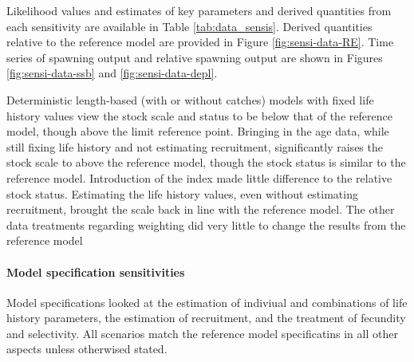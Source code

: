 \documentclass[11pt,
  english,
  a4paper,
]{article}
\begin{document}
\tagstructend


Likelihood values and estimates of key parameters and derived quantities from each sensitivity are available in Table \ref{tab:data_sensis}. Derived quantities relative to the reference model are provided in Figure \ref{fig:sensi-data-RE}. Time series of spawning output and relative spawning output are shown in Figures \ref{fig:sensi-data-ssb} and \ref{fig:sensi-data-depl}.

\leavevmode\tagmcend\tagstructend\par


Deterministic length-based (with or without catches) models with fixed life history values view the stock scale and status to be below that of the reference model, though above the limit reference point. Bringing in the age data, while still fixing life history and not estimating recruitment, significantly raises the stock scale to above the reference model, though the stock status is similar to the reference model. Introduction of the index made little difference to the relative stock status. Estimating the life history values, even without estimating recruitment, brought the scale back in line with the reference model. The other data treatments regarding weighting did very little to change the results from the reference model

\leavevmode\tagmcend\tagstructend\par


\hypertarget{model-specification-sensitivities}{%
\paragraph{Model specification sensitivities}\label{model-specification-sensitivities}}

\leavevmode\tagmcend\tagstructend


Model specifications looked at the estimation of indiviual and combinations of life history parameters, the estimation of recruitment, and the treatment of fecundity and selectivity. All scenarios match the reference model specificatins in all other aspects unless otherwised stated.

\leavevmode\tagmcend\tagstructend\par
\end{document}
